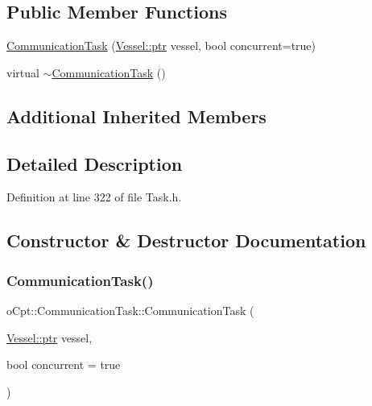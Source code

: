 \subsection*{Public Member Functions}
\begin{DoxyCompactItemize}
\item 
\hyperlink{classo_cpt_1_1_communication_task_a40993dba58872287d4b7a8a736049735}{Communication\+Task} (\hyperlink{classo_cpt_1_1i_vessel_a43711a596f3bdfd0ca732ed3901edc97}{Vessel\+::ptr} vessel, bool concurrent=true)
\item 
virtual \hyperlink{classo_cpt_1_1_communication_task_a046da901df467610f94dbe0a8e3add00}{$\sim$\+Communication\+Task} ()
\end{DoxyCompactItemize}
\subsection*{Additional Inherited Members}


\subsection{Detailed Description}


Definition at line 322 of file Task.\+h.



\subsection{Constructor \& Destructor Documentation}
\hypertarget{classo_cpt_1_1_communication_task_a40993dba58872287d4b7a8a736049735}{}\label{classo_cpt_1_1_communication_task_a40993dba58872287d4b7a8a736049735} 
\subsubsection{\texorpdfstring{Communication\+Task()}{CommunicationTask()}}
{\footnotesize\ttfamily o\+Cpt\+::\+Communication\+Task\+::\+Communication\+Task (\begin{DoxyParamCaption}\item[{\hyperlink{classo_cpt_1_1i_vessel_a43711a596f3bdfd0ca732ed3901edc97}{Vessel\+::ptr}}]{vessel,  }\item[{bool}]{concurrent = {\ttfamily true} }\end{DoxyParamCaption})}



